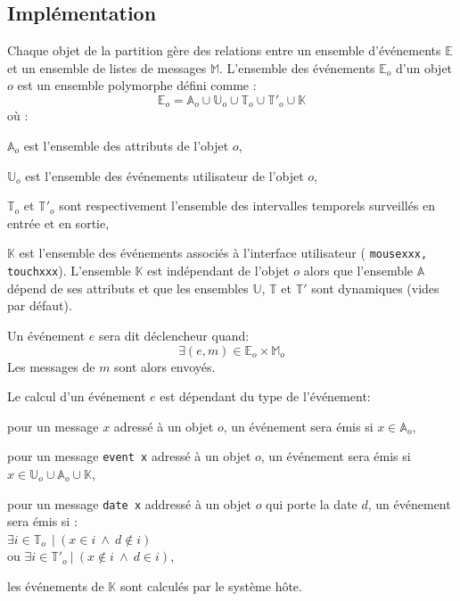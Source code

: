 \documentclass{article}
\newcommand{\OSC}[1]	{{\fontsize{9pt}{9pt} \selectfont\texttt{#1}}}
\let\olditemize\itemize
\let\oldenditemize\enditemize
\renewenvironment{itemize} 	{\olditemize \renewcommand{\labelitemi}{$\bullet$} \setlength{\itemsep}{0mm}}{\oldenditemize}
\begin{document}
\subsection{Implémentation}

Chaque objet de la partition gère des relations entre un ensemble d'événements $\mathbb{E}$ et un ensemble de listes de messages $\mathbb{M}$. L'ensemble des événements $\mathbb{E}_o$ d'un objet $o$ est un ensemble polymorphe défini comme : 
\[
	\mathbb{E}_o = \mathbb{A}_o \cup \mathbb{U}_o \cup \mathbb{T}_o \cup \mathbb{T'}_o \cup \mathbb{K}  
\] 
où :
\begin{itemize}
\item[-] $\mathbb{A}_o$ est l'ensemble des attributs de l'objet $o$, 
\item[-] $\mathbb{U}_o$ est l'ensemble des événements utilisateur de l'objet $o$, 
\item[-] $\mathbb{T}_o$ et $\mathbb{T'}_o$ sont respectivement l'ensemble des intervalles temporels surveillés en entrée et en sortie,
\item[-] $\mathbb{K}$ est l'ensemble des événements associés à l'interface utilisateur (\OSC{mousexxx, touchxxx}).
\end{itemize}
L'ensemble $\mathbb{K}$ est indépendant de l'objet $o$ alors que l'ensemble $\mathbb{A}$ dépend de ses attributs et que les ensembles $\mathbb{U}$, $\mathbb{T}$ et $\mathbb{T'}$ sont dynamiques (vides par défaut).

Un événement $e$ sera dit déclencheur quand:
\[
	\exists (e, m) \in \mathbb{E}_o \times \mathbb{M}_o  
\] 
Les messages de $m$ sont alors envoyés.

Le calcul d'un événement $e$ est dépendant du type de l'événement:
\begin{itemize}
\item[-] pour un message $x$ adressé à un objet $o$, un événement sera émis si $x \in \mathbb{A}_o$, 
\item[-] pour un message \OSC{event x} adressé à un objet $o$, un événement sera émis si $x \in \mathbb{U}_o \cup \mathbb{A}_o \cup  \mathbb{K}$,
\item[-] pour un message \OSC{date x} addressé à un objet $o$ qui porte la date $d$, un événement sera émis si :\\ 
\hspace*{3.5mm} $\exists i \in \mathbb{T}_o\ \ |\ (x \in i\ \land\ d \not\in i)$ \\
ou $\exists i \in \mathbb{T'}_o\ |\ (x \not \in i\ \land\ d \in i)$,
\item[-] les événements de $\mathbb{K}$ sont calculés par le système hôte.
\end{itemize}
\end{document}
